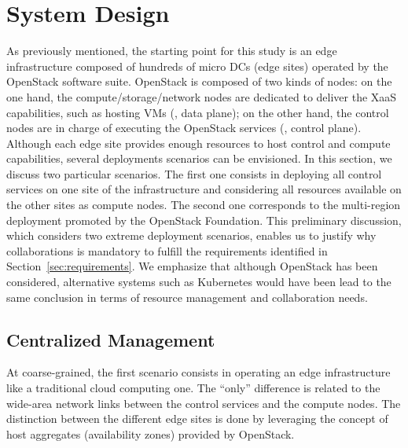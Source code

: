 

\section{System Design}
\label{sec:system_design_considerations}
As previously mentioned, the starting point for this study is an edge
infrastructure composed of hundreds of micro DCs (\aka edge sites)
operated by the OpenStack software suite.
%
OpenStack is composed of two kinds
of nodes: on the one hand, the compute/storage/network nodes are
dedicated to deliver the XaaS capabilities, such as hosting VMs (\ie,
data plane); on the other hand, the control nodes are in charge of
executing the OpenStack services (\ie, control plane).
%
Although each edge site provides enough resources to host control and
compute capabilities, several deployments scenarios can be
envisioned. In
this section, we discuss two particular scenarios. The first one
consists in deploying all control services on one site of the
infrastructure and considering all resources available on the other sites as compute
nodes.  The second one corresponds to the multi-region deployment promoted by the OpenStack Foundation.
%
This preliminary discussion, which considers two extreme deployment
scenarios, enables us to justify why collaborations is mandatory to
fulfill the requirements identified in Section~\ref{sec:requirements}.
%
We emphasize that although OpenStack has been considered, alternative
systems such as Kubernetes would have been lead to the same conclusion
in terms of resource management and collaboration needs.  

\subsection{Centralized Management}
\label{subsec:centralized_os}
At coarse-grained, the first scenario consists in operating an edge
infrastructure like a traditional cloud computing one.  The ``only''
difference is related to the wide-area network links between the
control services and the compute nodes.  The distinction between the
different edge sites is done by leveraging the concept of host
aggregates (\aka availability zones) provided by OpenStack.

